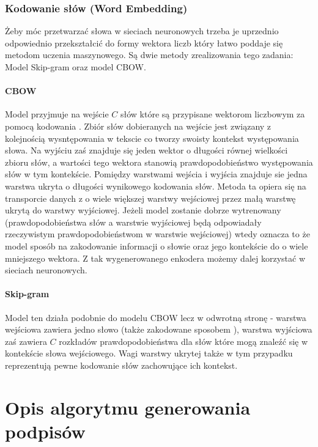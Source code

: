 \subsubsection{Kodowanie słów (Word Embedding)}
Żeby móc przetwarzać słowa w sieciach neuronowych trzeba je uprzednio odpowiednio przekształcić do formy wektora liczb który łatwo poddaje się metodom uczenia maszynowego. Są dwie metody zrealizowania tego zadania: Model Skip-gram oraz model CBOW.
\paragraph{CBOW}
Model przyjmuje na wejście $C$ słów które są przypisane wektorom liczbowym za pomocą kodowania . Zbiór słów dobieranych na wejście jest związany z kolejnością wysntępowania w tekscie co tworzy swoisty kontekst występowania słowa. Na wyjściu zaś znajduje się jeden wektor o długości równej wielkości zbioru słów, a wartości tego wektora stanowią prawdopodobieństwo występowania słów w tym kontekście. Pomiędzy warstwami wejścia i wyjścia znajduje sie jedna warstwa ukryta o długości wynikowego kodowania słów. Metoda ta opiera się na transporcie danych z o wiele większej warstwy wejściowej przez małą warstwę ukrytą do warstwy wyjściowej. Jeżeli model zostanie dobrze wytrenowany (prawdopodobieństwa słów a warstwie wyjściowej będą odpowiadały rzeczywistym prawdopodobieństwom w warstwie wejściowej) wtedy oznacza to że model  sposób na zakodowanie informacji o słowie oraz jego kontekście do o wiele mniejszego wektora. Z tak wygenerowanego enkodera możemy dalej korzystać w sieciach neuronowych. \cite[p.~1,3]{word-embed}
\paragraph{Skip-gram}
Model ten działa podobnie do modelu CBOW lecz w odwrotną stronę - warstwa wejściowa zawiera jedno słowo (także zakodowane sposobem ), warstwa wyjściowa zaś zawiera $C$ rozkładów prawdopodobieństwa dla słów które mogą znaleźć się w kontekście słowa wejściowego. Wagi warstwy ukrytej także w tym przypadku reprezentują pewne kodowanie słów zachowujące ich kontekst.

\section{Opis algorytmu generowania podpisów}

